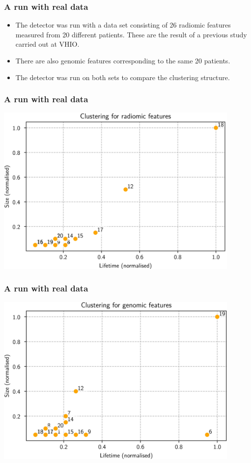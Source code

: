 \documentclass[xcolor=dvipsnames]{beamer}
\begin{document}
\begin{frame}
	\frametitle{A run with real data}
	\begin{itemize}
		\item The detector was run with a data set consisting of 26 radiomic features measured
			from 20 different patients. These are the result of a previous study carried out at
			VHIO. \pause
		\item There are also genomic features corresponding to the same 20 patients. \pause
		\item The detector was run on both sets to compare the clustering structure. 
	\end{itemize}
\end{frame}

\begin{frame}
	\frametitle{A run with real data}
	\centering
	\includegraphics[width = 0.9\textwidth]{beamer/radiomic}
\end{frame}

\begin{frame}
	\frametitle{A run with real data}
	\centering
	\includegraphics[width = 0.9\textwidth]{beamer/genomic}
\end{frame}
\end{document}
